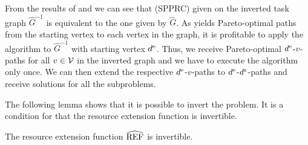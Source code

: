 From the results of  and  we can see that (SPPRC) given on the inverted task graph $\widehat{G}^{-1}$ is equivalent to the one given by $\widehat{G}$. As  yields Pareto-optimal paths from the starting vertex to each vertex in the graph, it is profitable to apply the algorithm to $\widehat{G}^{-1}$ with starting vertex $d^{\operatorname{e}}$. Thus, we receive Pareto-optimal $d^{\operatorname{e}}$-$v$-paths for all $v\in\mathcal{V}$ in the inverted graph and we have to execute the algorithm only once. We can then extend the respective $d^{\operatorname{e}}$-$v$-paths to $d^{\operatorname{e}}$-$d^{\operatorname{s}}$-paths and receive solutions for all the subproblems.

The following lemma shows that it is possible to invert the problem. It is a condition for  that the resource extension function is invertible.

\begin{lemma}

The resource extension function $\widehat{\operatorname{REF}}$ is invertible. 

\end{lemma}

